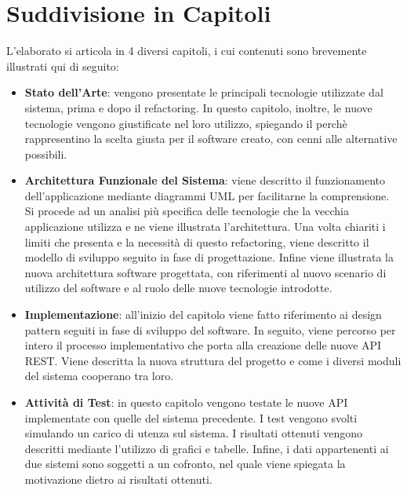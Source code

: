 \section*{Suddivisione in Capitoli}
L'elaborato si articola in 4 diversi capitoli, i cui contenuti sono brevemente illustrati qui di seguito:
\begin{itemize}
    \item \textbf{Stato dell'Arte}: vengono presentate le principali tecnologie utilizzate dal sistema, prima e dopo il refactoring. In questo capitolo, inoltre, le nuove tecnologie vengono giustificate nel loro utilizzo, spiegando il perchè rappresentino la scelta giusta per il software creato, con cenni alle alternative possibili.
    \item \textbf{Architettura Funzionale del Sistema}: viene descritto il funzionamento dell'applicazione mediante diagrammi UML per facilitarne la comprensione. Si procede ad un analisi più specifica delle tecnologie che la vecchia applicazione utilizza e ne viene illustrata l'architettura. Una volta chiariti i limiti che presenta e la necessità di questo refactoring, viene descritto il modello di sviluppo seguito in fase di progettazione. Infine viene illustrata la nuova architettura software progettata, con riferimenti al nuovo scenario di utilizzo del software e al ruolo delle nuove tecnologie introdotte.
    \item \textbf{Implementazione}: all'inizio del capitolo viene fatto riferimento ai design pattern seguiti in fase di sviluppo del software. In seguito, viene percorso per intero il processo implementativo che porta alla creazione delle nuove API REST. Viene descritta la nuova struttura del progetto e come i diversi moduli del sistema cooperano tra loro.
    \item \textbf{Attività di Test}: in questo capitolo vengono testate le nuove API implementate con quelle del sistema precedente. I test vengono svolti simulando un carico di utenza sul sistema. I risultati ottenuti vengono descritti mediante l'utilizzo di grafici e tabelle. Infine, i dati appartenenti ai due sistemi sono soggetti a un cofronto, nel quale viene spiegata la motivazione dietro ai risultati ottenuti.
\end{itemize} 
\mainmatter